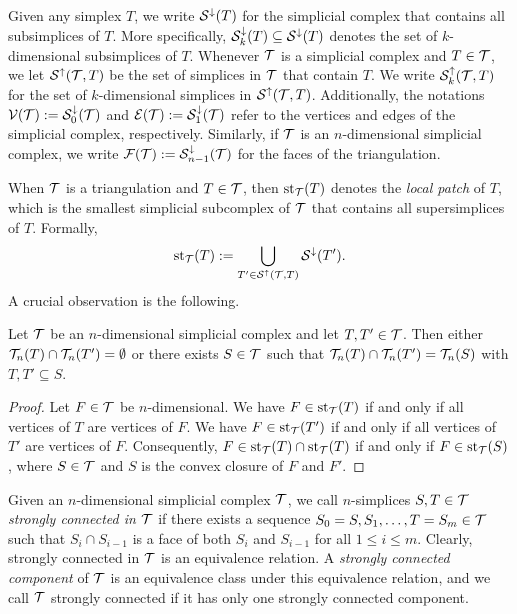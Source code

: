 \documentclass[a4paper]{amsart}
\begin{document}
Given any simplex $T$, we write ${\mathcal S}^{\downarrow}(T)$ for the simplicial complex that contains all subsimplices of $T$. 
More specifically, ${\mathcal S}^{\downarrow}_{{k}}(T) \subseteq {\mathcal S}^{\downarrow}(T)$ denotes the set of $k$-dimensional subsimplices of $T$. 
Whenever ${\mathcal T}$ is a simplicial complex and $T \in {\mathcal T}$, we let ${\mathcal S}^{\uparrow}({\mathcal T},T)$ be the set of simplices in ${\mathcal T}$ that contain $T$.
We write ${\mathcal S}^{\uparrow}_{k}({\mathcal T},T)$ for the set of $k$-dimensional simplices in ${\mathcal S}^{\uparrow}({\mathcal T},T)$. 
Additionally, the notations ${\mathcal V}({\mathcal T}) := {\mathcal S}^{\downarrow}_{0}({\mathcal T})$ and ${\mathcal E}({\mathcal T}) := {\mathcal S}^{\downarrow}_{1}({\mathcal T})$ refer to the vertices and edges of the simplicial complex, respectively. Similarly, if ${\mathcal T}$ is an $n$-dimensional simplicial complex, we write ${\mathcal F}({\mathcal T}) := {\mathcal S}^{\downarrow}_{n-1}({\mathcal T})$ for the faces of the triangulation. 

When ${\mathcal T}$ is a triangulation and $T \in {\mathcal T}$, then $\operatorname{st}_{{\mathcal T}}(T)$ denotes the \emph{local patch} of $T$, which is the smallest simplicial subcomplex of ${\mathcal T}$ that contains all supersimplices of $T$. Formally,
\begin{gather*}
    \operatorname{st}_{{\mathcal T}}(T) := \bigcup_{ T' \in {\mathcal S}^{\uparrow}({\mathcal T},T) } {\mathcal S}^{\downarrow}(T').
\end{gather*}
A crucial observation is the following.

\begin{lemma}
 Let ${\mathcal T}$ be an $n$-dimensional simplicial complex and let $T,T' \in {\mathcal T}$.
 Then either ${\mathcal T}_{n}(T) \cap {\mathcal T}_{n}(T') = \emptyset$ or there exists $S \in {\mathcal T}$
 such that ${\mathcal T}_{n}(T) \cap {\mathcal T}_{n}(T') = {\mathcal T}_{n}(S)$ with $T, T' \subseteq S$.
\end{lemma}
\begin{proof}
 Let $F \in {\mathcal T}$ be $n$-dimensional.
 We have $F \in \operatorname{st}_{{\mathcal T}}(T )$ if and only if all vertices of $T $ are vertices of $F$.
 We have $F \in \operatorname{st}_{{\mathcal T}}(T')$ if and only if all vertices of $T'$ are vertices of $F$.
 Consequently, $F \in \operatorname{st}_{{\mathcal T}}(T) \cap \operatorname{st}_{{\mathcal T}}(T)$ if and only if $F \in \operatorname{st}_{{\mathcal T}}(S)$,
 where $S \in {\mathcal T}$ and $S$ is the convex closure of $F$ and $F'$.
\end{proof}

Given an $n$-dimensional simplicial complex ${\mathcal T}$, 
we call $n$-simplices $S,T \in {\mathcal T}$ \emph{strongly connected in ${\mathcal T}$} if there exists a sequence $S_0=S,S_1,\dots,T=S_m \in {\mathcal T}$ such that $S_{i} \cap S_{i-1}$ is a face of both $S_{i}$ and $S_{i-1}$ for all $1 \leq i \leq m$. Clearly, strongly connected in ${\mathcal T}$ is an equivalence relation. A \emph{strongly connected component} of ${\mathcal T}$ is an equivalence class under this equivalence relation, and we call ${\mathcal T}$ strongly connected if it has only one strongly connected component. 
\end{document}
